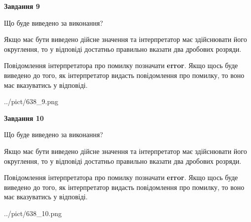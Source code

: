 \documentclass[12pt, ukrainian]{article}
\begin{document}
{\begin {Large}
{\begin {center}\textbf{Завдання 9}\end {center}}\par
Що буде виведено за виконання? \par

Якщо має бути виведено дійсне значення та інтерпретатор має здійснювати його округлення, 
то у відповіді достатньо правильно вказати два дробових розряди.

Повідомлення інтерпретатора про помилку позначати \textbf{error}.
Якщо щось буде виведено до того, як інтерпретатор видасть повідомлення про помилку, 
то воно має вказуватись у відповіді. \par

\begin{center}
	{../pict/638_9.png}
\end{center}
\newpage

{\begin {center}\textbf{Завдання 10}\end {center}}\par
Що буде виведено за виконання? \par

Якщо має бути виведено дійсне значення та інтерпретатор має здійснювати його округлення, 
то у відповіді достатньо правильно вказати два дробових розряди.

Повідомлення інтерпретатора про помилку позначати \textbf{error}.
Якщо щось буде виведено до того, як інтерпретатор видасть повідомлення про помилку, 
то воно має вказуватись у відповіді. \par

\begin{center}
	{../pict/638_10.png}
\end{center}
\newpage

\end {Large}}
\end{document}
